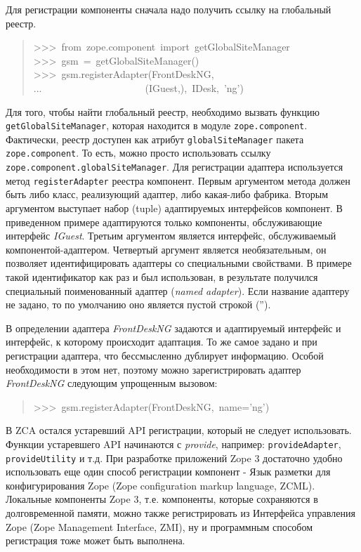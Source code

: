 \documentclass[a4paper,openany,twoside,final]{book}
\providecommand*{\DUroletitlereference}[1]{\textsl{#1}}
\begin{document}
Для регистрации компоненты сначала надо получить ссылку на глобальный
реестр.

\begin{quote}{\ttfamily \raggedright \noindent
>{}>{}>~from~zope.component~import~getGlobalSiteManager\\
>{}>{}>~gsm~=~getGlobalSiteManager()\\
>{}>{}>~gsm.registerAdapter(FrontDeskNG,\\
...~~~~~~~~~~~~~~~~~~~~~(IGuest,),~IDesk,~'ng')
}
\end{quote}

Для того, чтобы найти глобальный реестр, необходимо вызвать функцию
\texttt{getGlobalSiteManager}, которая находится в модуле
\texttt{zope.component}.  Фактически, реестр доступен как атрибут
\texttt{globalSiteManager} пакета \texttt{zope.component}.  То есть, можно
просто использовать ссылку \texttt{zope.component.globalSiteManager}.  Для
регистрации адаптера используется метод \texttt{registerAdapter} реестра
компонент.  Первым аргументом метода должен быть либо класс,
реализующий адаптер, либо какая-либо фабрика.  Вторым аргументом
выступает набор (tuple) адаптируемых интерфейсов компонент.  В
приведенном примере адаптируются только компоненты, обслуживающие
интерфейс \DUroletitlereference{IGuest}.  Третьим аргументом является интерфейс,
обслуживаемый компонентой-адаптером.  Четвертый аргумент является
необязательным, он позволяет идентифицировать адаптеры со специальными
свойствами.  В примере такой идентификатор как раз и был использован,
в результате получился специальный поименованный адаптер (\DUroletitlereference{named
adapter}).  Если название адаптеру не задано, то по умолчанию оно является
пустой строкой ('').

В определении адаптера \DUroletitlereference{FrontDeskNG} задаются и адаптируемый интерфейс
и интерфейс, к которому происходит адаптация.  То же самое задано и
при регистрации адаптера, что бессмысленно дублирует информацию.
Особой необходимости в этом нет, поэтому можно зарегистрировать
адаптер \DUroletitlereference{FrontDeskNG} следующим упрощенным вызовом:

\begin{quote}{\ttfamily \raggedright \noindent
>{}>{}>~gsm.registerAdapter(FrontDeskNG,~name='ng')
}
\end{quote}

В ZCA остался устаревший API регистрации, который не следует
использовать.  Функции устаревшего API начинаются с \DUroletitlereference{provide},
например: \texttt{provideAdapter}, \texttt{provideUtility} и т.д.  При
разработке приложений Zope 3 достаточно удобно использовать еще один
способ регистрации компонент - Язык разметки для конфигурирования Zope
(Zope configuration markup language, ZCML).  Локальные компоненты Zope
3, т.е. компоненты, которые сохраняются в долговременной памяти, можно
также регистрировать из Интерфейса управления Zope (Zope Management
Interface, ZMI), ну и программным способом регистрация тоже может быть
выполнена.
\end{document}
